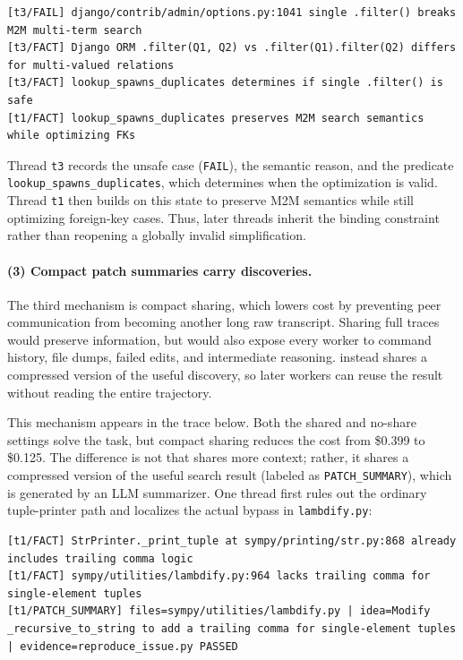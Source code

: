 \begin{lstlisting}[style=gist]
[t3/FAIL] django/contrib/admin/options.py:1041 single .filter() breaks M2M multi-term search
[t3/FACT] Django ORM .filter(Q1, Q2) vs .filter(Q1).filter(Q2) differs for multi-valued relations
[t3/FACT] lookup_spawns_duplicates determines if single .filter() is safe
[t1/FACT] lookup_spawns_duplicates preserves M2M search semantics while optimizing FKs
\end{lstlisting}

Thread \texttt{t3} records the unsafe case (\texttt{FAIL}), the semantic reason, and the predicate \texttt{lookup\_spawns\_duplicates}, which determines when the optimization is valid. Thread \texttt{t1} then builds on this state to preserve M2M semantics while still optimizing foreign-key cases. Thus, later threads inherit the binding constraint rather than reopening a globally invalid simplification.


\paragraph{(3) Compact patch summaries carry discoveries.} 
The third mechanism is compact sharing, which lowers cost by preventing peer
communication from becoming another long raw transcript. Sharing full traces
would preserve information, but would also expose every worker to command
history, file dumps, failed edits, and intermediate reasoning. \toolName{}
instead shares a compressed version of the useful discovery, so later workers can reuse the result without reading the entire trajectory.

This mechanism appears in the trace below. Both the shared and no-share settings solve the task, but compact sharing reduces the cost from \$0.399 to \$0.125. The difference is not that \toolName{} shares more context; rather, it shares a compressed version of the useful search result (labeled as \texttt{PATCH\_SUMMARY}), which is generated by an LLM summarizer. One thread first rules out the ordinary tuple-printer path and localizes the actual bypass in \texttt{lambdify.py}:

\begin{lstlisting}[style=gist]
[t1/FACT] StrPrinter._print_tuple at sympy/printing/str.py:868 already includes trailing comma logic
[t1/FACT] sympy/utilities/lambdify.py:964 lacks trailing comma for single-element tuples
[t1/PATCH_SUMMARY] files=sympy/utilities/lambdify.py | idea=Modify _recursive_to_string to add a trailing comma for single-element tuples | evidence=reproduce_issue.py PASSED
\end{lstlisting}

